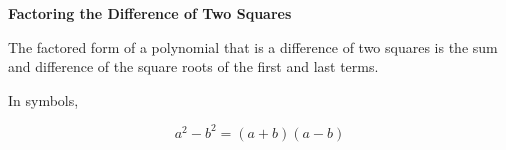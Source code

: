 \begin{center}
\textbf{Factoring the Difference of Two Squares}
\end{center}

\vspace*{1ex}

The factored form of a polynomial that is a difference of two squares is the sum and difference of the square roots of the first and last terms. 

\vspce

In symbols, 

$$\displaystyle a^{2}-b^{2} = (a+b)(a-b) $$
